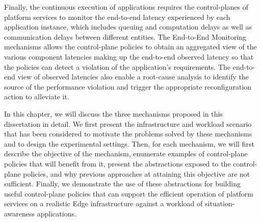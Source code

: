 \par Finally, the continuous execution of applications requires the control-planes of platform services to monitor the end-to-end latency experienced by each application instance, which includes queuing and computation delays as well as communication delays between different entities. The End-to-End Monitoring mechanisms allows the control-plane policies to obtain an aggregated view of the various component latencies making up the end-to-end observed latency so that the policies can detect a violation of the application's requirements. The end-to-end view of observed latencies also enable a root-cause analysis to identify the source of the performance violation and trigger the appropriate reconfiguration action to alleviate it. 
\par In this chapter, we will discuss the three mechanisms proposed in this dissertation in detail. We first present the infrastructure and workload scenario that has been considered to motivate the problems solved by these mechanisms and to design the experimental settings. Then, for each mechanism, we will first describe the objective of the mechanism, enumerate examples of control-plane policies that will benefit from it, present the abstractions exposed to the control-plane policies, and why previous approaches at attaining this objective are not sufficient. Finally, we demonstrate the use of these abstractions for building useful control-plane policies that can support the efficient operation of platform services on a realistic Edge infrastructure against a workload of situation-awareness applications. 

